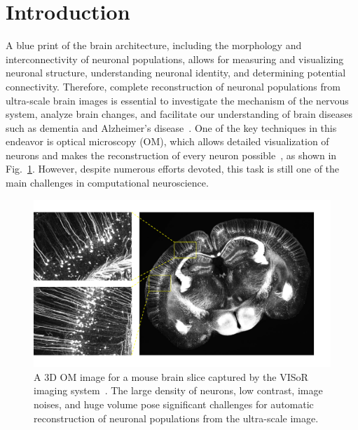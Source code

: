 \section{Introduction}
\label{sec:introduction}

A blue print of the brain architecture, including the morphology and interconnectivity of neuronal populations, allows for measuring and visualizing neuronal structure, understanding neuronal identity, and determining potential connectivity.
Therefore, complete reconstruction of neuronal populations from ultra-scale brain images is essential to investigate the mechanism of the nervous system, analyze brain changes, and facilitate our understanding of brain diseases such as dementia and Alzheimer's disease~\cite{Petrella2003, Giorgio2013}.
One of the key techniques in this endeavor is optical microscopy (OM), which allows detailed visualization of neurons and makes the reconstruction of every neuron possible~\cite{Senft2011}, as shown in Fig.~\ref{fig:brain}.
However, despite numerous efforts devoted, this task is still one of the main challenges in computational neuroscience.

\begin{figure}[t]
	\centering
	\includegraphics[width=1\columnwidth]{./Illustrations/brain2.pdf}
	\caption{A 3D OM image for a mouse brain slice captured by the VISoR imaging system~\cite{Wang2019}. The large density of neurons, low contrast, image noises, and huge volume pose significant challenges for automatic reconstruction of neuronal populations from the ultra-scale image.}	
	\label{fig:brain}
\end{figure}

